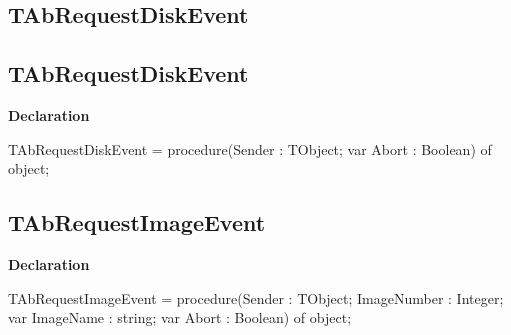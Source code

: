 \documentclass{report}
\newif\ifpdf
\begin{document}
\subsection*{\large{\textbf{TAbRequestDiskEvent}}\normalsize\hspace{1ex}\hrulefill}
\else
\subsection*{TAbRequestDiskEvent}
\fi
\label{AbArcTyp-TAbRequestDiskEvent}
\begin{list}{}{
\setlength{\itemindent}{0cm}
\setlength{\listparindent}{0cm}
\setlength{\leftmargin}{\evensidemargin}
\addtolength{\leftmargin}{\tmplength}
\settowidth{\labelsep}{X}
\addtolength{\leftmargin}{\labelsep}
\setlength{\labelwidth}{\tmplength}
}
\item[\textbf{Declaration}\hfill]
\ifpdf
\begin{flushleft}
\fi
\begin{ttfamily}
TAbRequestDiskEvent = procedure(Sender : TObject; var Abort : Boolean) of object;\end{ttfamily}

\ifpdf
\end{flushleft}
\fi

\end{list}
\ifpdf
\subsection*{\large{\textbf{TAbRequestImageEvent}}\normalsize\hspace{1ex}\hrulefill}
\else
\subsection*{TAbRequestImageEvent}
\fi
\label{AbArcTyp-TAbRequestImageEvent}
\begin{list}{}{
\setlength{\itemindent}{0cm}
\setlength{\listparindent}{0cm}
\setlength{\leftmargin}{\evensidemargin}
\addtolength{\leftmargin}{\tmplength}
\settowidth{\labelsep}{X}
\addtolength{\leftmargin}{\labelsep}
\setlength{\labelwidth}{\tmplength}
}
\item[\textbf{Declaration}\hfill]
\ifpdf
\begin{flushleft}
\fi
\begin{ttfamily}
TAbRequestImageEvent = procedure(Sender : TObject; ImageNumber : Integer; var ImageName : string; var Abort : Boolean) of object;\end{ttfamily}

\ifpdf
\end{flushleft}
\fi

\end{list}
\ifpdf
\end{document}
